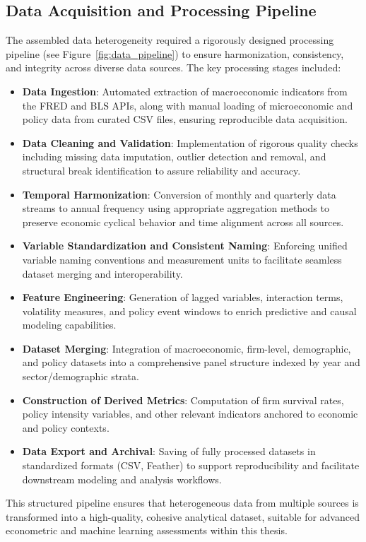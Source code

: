 \subsection{Data Acquisition and Processing Pipeline}
The assembled data heterogeneity required a rigorously designed processing pipeline (see Figure~\ref{fig:data_pipeline}) to ensure harmonization, consistency, and integrity across diverse data sources. The key processing stages included:
\begin{itemize}
    \item \textbf{Data Ingestion}: Automated extraction of macroeconomic indicators from the FRED and BLS APIs, along with manual loading of microeconomic and policy data from curated CSV files, ensuring reproducible data acquisition.
    \item \textbf{Data Cleaning and Validation}: Implementation of rigorous quality checks including missing data imputation, outlier detection and removal, and structural break identification to assure reliability and accuracy.
    \item \textbf{Temporal Harmonization}: Conversion of monthly and quarterly data streams to annual frequency using appropriate aggregation methods to preserve economic cyclical behavior and time alignment across all sources.
    \item \textbf{Variable Standardization and Consistent Naming}: Enforcing unified variable naming conventions and measurement units to facilitate seamless dataset merging and interoperability.
    \item \textbf{Feature Engineering}: Generation of lagged variables, interaction terms, volatility measures, and policy event windows to enrich predictive and causal modeling capabilities.
    \item \textbf{Dataset Merging}: Integration of macroeconomic, firm-level, demographic, and policy datasets into a comprehensive panel structure indexed by year and sector/demographic strata.
    \item \textbf{Construction of Derived Metrics}: Computation of firm survival rates, policy intensity variables, and other relevant indicators anchored to economic and policy contexts.
    \item \textbf{Data Export and Archival}: Saving of fully processed datasets in standardized formats (CSV, Feather) to support reproducibility and facilitate downstream modeling and analysis workflows.
\end{itemize}
This structured pipeline ensures that heterogeneous data from multiple sources is transformed into a high-quality, cohesive analytical dataset, suitable for advanced econometric and machine learning assessments within this thesis.

